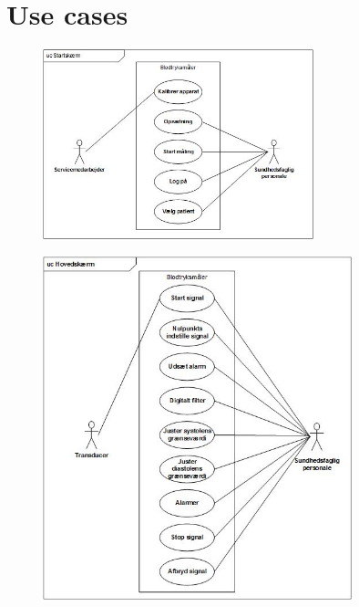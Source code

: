 \section{Use cases}
\begin{figure}[h!]
\includegraphics[width =0.7\textwidth , center]{billeder/UCStart}
\end{figure}
\begin{figure}[h!]
\includegraphics[width =0.8\textwidth , center]{billeder/UChoved}
\end{figure}
\newpage
